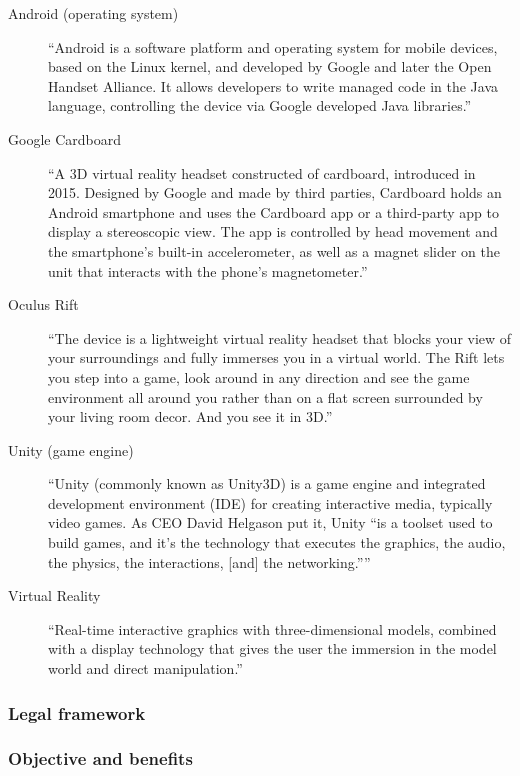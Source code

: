 \documentclass[preprint,12pt]{elsarticle}
\begin{document}
		\begin{description}
			\item[Android (operating system)]
				``Android is a software platform and 
				operating system for mobile devices, 
				based on the Linux kernel, and developed 
				by Google and later the Open Handset 
				Alliance. It allows developers to write 
				managed code in the Java language, 
				controlling the device via Google
				developed Java libraries.'' \cite{AndroidOS}
			\item[Google Cardboard]
				``A 3D virtual reality headset constructed of
				cardboard, introduced in 2015. Designed by
				Google and made by third parties, Cardboard
				holds an Android smartphone and uses the
				Cardboard app or a third-party app to display
				a stereoscopic view. The app is controlled by
				head movement and the smartphone's built-in
				accelerometer, as well as a magnet slider on
				the unit that interacts with the phone's
				magnetometer.'' \cite{GoogleCardboard}
			\item[Oculus Rift]
				``The device 
				is a lightweight virtual reality headset that
				blocks your view of your surroundings and fully
				immerses you in a virtual world. The Rift lets
				you step into a game, look around in any
				direction and see the game environment all
				around you rather than on a flat screen
				surrounded by your living room decor. And you
				see it in 3D.'' \cite{OculusRift}
			\item[Unity (game engine)]
				``Unity (commonly known as Unity3D) is a game
				engine and integrated development environment
				(IDE) for creating interactive media, typically
				video games. As CEO David Helgason put it,
				Unity ``is a toolset used to build games, and
				it’s the technology that executes the graphics,
				the audio, the physics, the interactions,
				[and] the networking.'''' \cite{UnityEngine}
			\item[Virtual Reality]
				``Real-time interactive  graphics
				with three-dimensional models, combined with a
				display technology that gives the user the
				immersion in the model world and direct
				manipulation.'' \cite{VirtualReality}
		\end{description}
		\subsubsection{Legal framework}
		\subsubsection{Objective and benefits}
\end{document}
